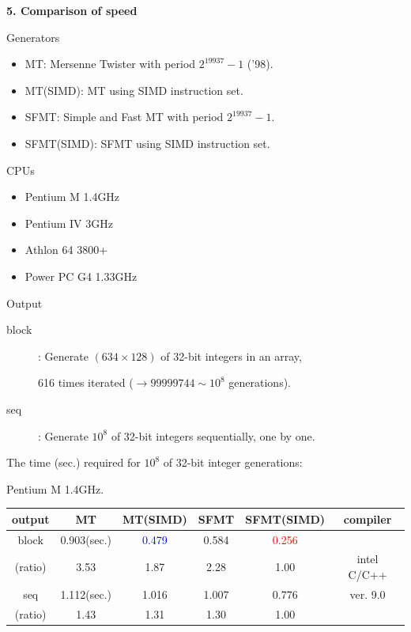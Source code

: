 \documentclass[a4j,12pt,landscape]{jarticle}
\begin{document}
\newpage
\noindent
{\bf 5. Comparison of speed}
\begin{description}
  \item Generators
    \begin{itemize}
    \item MT: Mersenne Twister with period $2^{19937}-1$ ('98).
    \item MT(SIMD): MT using SIMD instruction set.
    \item SFMT: Simple and Fast MT with period $2^{19937}-1$.
    \item SFMT(SIMD): SFMT using SIMD instruction set.
    \end{itemize}
  \item CPUs
    \begin{itemize}
      \item Pentium M 1.4GHz
      \item Pentium IV 3GHz
      \item Athlon 64 3800+
      \item Power PC G4 1.33GHz  
    \end{itemize}
    \newpage
    \item Output
      \begin{description}
      \item[block]: Generate $(634 \times 128)$ of 32-bit integers 
        in an array, 
        
        616 times iterated ($\to 99999744\sim 10^8$ generations).
      \item[seq]: Generate $10^8$ of 32-bit integers sequentially,
        one by one.
      \end{description}
    \end{description}

\newpage
\begin{center}
The time (sec.) required for $10^8$ 
of 32-bit integer generations:

Pentium M 1.4GHz. 

\vskip 2mm
\begin{tabular}{|c||c|c|c|c|c|}
\hline
output & MT & MT{\Large(SIMD)} & SFMT & SFMT{\Large (SIMD)} & compiler
 \\ \hline \hline
 block   & 0.903(sec.) & \textcolor{blue}{0.479}
 & 0.584 & \textcolor{red}{0.256} &    \\ \cline{2-5}
 (ratio) & 3.53\phantom{0}  & 1.87\phantom{0}  & 2.28\phantom{0}  & 1.00\phantom{0}  & intel C/C++ \\ \cline{1-5}
 seq     & 1.112(sec.) & 1.016 & 1.007 & 0.776 & ver. 9.0\\ \cline{2-5}
 (ratio) & 1.43\phantom{0} & 1.31\phantom{0}  & 1.30\phantom{0}  & 1.00\phantom{0}  &  \\ \hline
\end{tabular}
\end{center}
\end{document}
